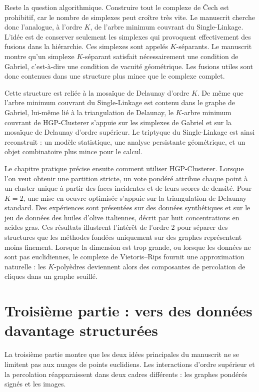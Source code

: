 Reste la question algorithmique. Construire tout le complexe de \v{C}ech est prohibitif, car le nombre de simplexes peut croître très vite. Le manuscrit cherche donc l'analogue, à l'ordre $K$, de l'arbre minimum couvrant du Single-Linkage. L'idée est de conserver seulement les simplexes qui provoquent effectivement des fusions dans la hiérarchie. Ces simplexes sont appelés $K$-séparants. Le manuscrit montre qu'un simplexe $K$-séparant satisfait nécessairement une condition de Gabriel, c'est-à-dire une condition de vacuité géométrique. Les fusions utiles sont donc contenues dans une structure plus mince que le complexe complet.

Cette structure est reliée à la mosaïque de Delaunay d'ordre $K$. De même que l'arbre minimum couvrant du Single-Linkage est contenu dans le graphe de Gabriel, lui-même lié à la triangulation de Delaunay, le $K$-arbre minimum couvrant de HGP-Clusterer s'appuie sur les simplexes de Gabriel et sur la mosaïque de Delaunay d'ordre supérieur. Le triptyque du Single-Linkage est ainsi reconstruit : un modèle statistique, une analyse persistante géométrique, et un objet combinatoire plus mince pour le calcul.

Le chapitre pratique précise ensuite comment utiliser HGP-Clusterer. Lorsque l'on veut obtenir une partition stricte, un vote pondéré attribue chaque point à un cluster unique à partir des faces incidentes et de leurs scores de densité. Pour $K=2$, une mise en oeuvre optimisée s'appuie sur la triangulation de Delaunay standard. Des expériences sont présentées sur des données synthétiques et sur le jeu de données des huiles d'olive italiennes, décrit par huit concentrations en acides gras. Ces résultats illustrent l'intérêt de l'ordre $2$ pour séparer des structures que les méthodes fondées uniquement sur des graphes représentent moins finement. Lorsque la dimension est trop grande, ou lorsque les données ne sont pas euclidiennes, le complexe de Vietoris--Rips fournit une approximation naturelle : les $K$-polyèdres deviennent alors des composantes de percolation de cliques dans un graphe seuillé.

\section*{Troisième partie : vers des données davantage structurées}

La troisième partie montre que les deux idées principales du manuscrit ne se limitent pas aux nuages de points euclidiens. Les interactions d'ordre supérieur et la percolation réapparaissent dans deux cadres différents : les graphes pondérés signés et les images.

